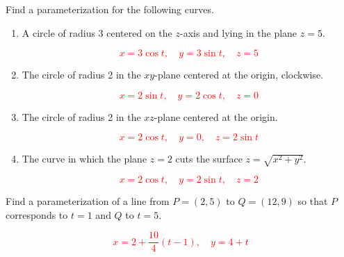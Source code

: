 \documentclass[12pt,reqno]{amsart}
\begin{document}
\bigskip
\prob Find a parameterization for the following curves.

\begin{enumerate}
\item A circle of radius 3 centered on the $z$-axis and lying in the plane $z=5$.

\bigskip
\textcolor{red}{
	\[x = 3\cos{t}, \quad y = 3\sin{t}, \quad z=5
	\]}
\bigskip

\item The circle of radius 2 in the $xy$-plane centered at the origin, clockwise.

\bigskip
\textcolor{red}{
	\[x = 2\sin{t}, \quad y = 2\cos{t}, \quad z=0
	\]}
\bigskip

\item The circle of radius 2 in the $xz$-plane centered at the origin.

\bigskip
\textcolor{red}{
	\[x = 2\cos{t}, \quad y = 0, \quad z= 2\sin{t}
	\]}
\bigskip

\item The curve in which the plane $z=2$ cuts the surface $z=\sqrt{x^2+y^2}$.

\bigskip
\textcolor{red}{
	\[x = 2\cos{t}, \quad y= 2\sin{t} , \quad z=2
	\]}
\bigskip
\end{enumerate}

\bigskip
\prob Find a parameterization of a line from $P=(2,5)$ to $Q=(12,9)$ so that $P$ corresponds to $t=1$ and $Q$ to $t=5$.

\bigskip
\textcolor{red}{
	\[x = 2 + \frac{10}{4}(t-1), \quad y = 4 + t
	\]}
\vfill
\end{document}
